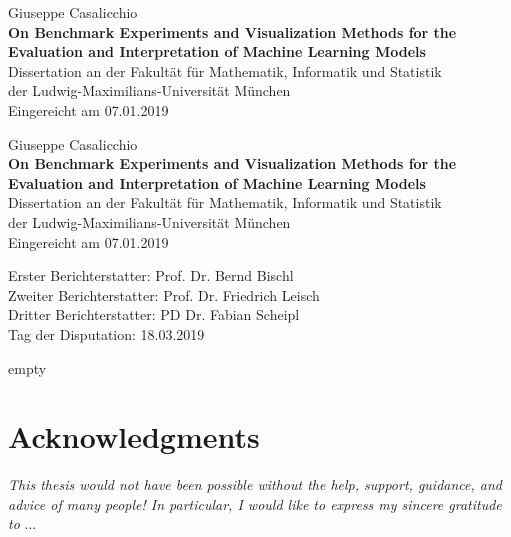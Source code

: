 \documentclass[bibliography=totoc,11pt,BCOR=12mm,DIV=14,twoside,parskip=half,paper=A4,pagesize=auto]{scrbook}\usepackage[]{graphicx}\usepackage{xcolor}
\newcommand{\Title}[9]{
  \frontmatter %
  \thispagestyle{empty}
  \begin{flushleft}

    \sffamily
    \Large #2 \\
    \vspace{2.1cm}
    \huge \textbf{#1}\\ \vspace{.8cm}
    \normalsize Dissertation an der Fakult\"at f\"ur #3 \\
    der Ludwig-Maximilians-Universit\"at M\"unchen \\ \vspace{.3cm}
    Eingereicht am #4

  \end{flushleft}
  \cleardoublepage

  \pagenumbering{roman}
  \thispagestyle{empty}
  \begin{flushleft}

    \sffamily
    \Large #2 \\ \vspace{2.1cm}
    \huge \textbf{#1}\\ \vfill
    \large Dissertation an der Fakult\"at f\"ur #3 \\
    der Ludwig-Maximilians-Universit\"at M\"unchen
    \\ [11.5mm]
    Eingereicht am #4

  \end{flushleft}

  \newpage
  \thispagestyle{empty}
  \begin{flushleft}

    \vspace*{\stretch{1}}
    \sffamily \large
    Erster Berichterstatter:  #5 \\
    Zweiter Berichterstatter: #6 \\
    Dritter Berichterstatter:  #7 \\ [11.5mm]
    Tag der Disputation: #8

  \end{flushleft}
  \newpage
}
\newcommand{\deadline}{07.01.2019}
\begin{document}
\Title
{On Benchmark Experiments and Visualization Methods for the Evaluation and Interpretation of Machine Learning Models}%
{Giuseppe Casalicchio}                    %
{Mathematik, Informatik und Statistik}    %
{\deadline}                               %
{Prof. Dr. Bernd Bischl}                  %
{Prof. Dr. Friedrich Leisch}              %
{PD Dr. Fabian Scheipl}                   %
{18.03.2019}                              %





\thispagestyle{empty}
\section*{Acknowledgments}
\textit{This thesis would not have been possible without the help, support, guidance, and advice of many people!
In particular, I would like to express my sincere gratitude to} $\dots$
\end{document}
